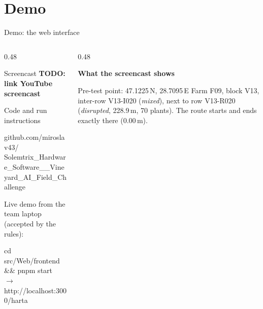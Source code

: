 \documentclass[aspectratio=169, 11pt, t]{beamer}
\newcommand{\TODO}[1]{{\setlength{\fboxsep}{1pt}\colorbox{red!12}{\color{red!70!black}\bfseries TODO: #1}}}
\begin{document}
\section{Demo}

\begin{frame}{Demo: the web interface}
  \begin{columns}[T]
    \begin{column}{0.48\textwidth}
      \begin{block}{Screencast}
        \scriptsize \TODO{link YouTube screencast}
      \end{block}
      \vspace{2mm}
      \begin{sxcard}{Code and run instructions}
        {\tiny\ttfamily github.com/miroslav43/\\Solemtrix\_Hardware\_Software\_\_Vineyard\_AI\_Field\_Challenge\par}
        \vspace{1.2mm}
        Live demo from the team laptop (accepted by the rules):\\[0.5mm]
        {\tiny\ttfamily cd src/Web/frontend \&\& pnpm start\\$\rightarrow$ http://localhost:3000/harta\par}
      \end{sxcard}
    \end{column}
    \begin{column}{0.48\textwidth}
      {\scriptsize\bfseries\color{sxNight} What the screencast shows\par}
      \vspace{1mm}
      \vspace{0.5mm}
      \begin{sxcard}{Pre-test point: 47.1225\,N, 28.7095\,E}
        Farm F09, block V13, inter-row V13-I020 (\emph{mixed}), next to row V13-R020
        (\emph{disrupted}, 228.9\,m, 70 plants). The route starts and ends exactly there (0.00\,m).
      \end{sxcard}
    \end{column}
  \end{columns}
\end{frame}
\end{document}
